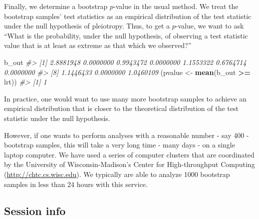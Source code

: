 \documentclass[oneside]{book}\usepackage[]{graphicx}\usepackage[]{color}
\newenvironment{Shaded}{\begin{snugshade}}{\end{snugshade}}
\newcommand{\CommentTok}[1]{\textcolor[rgb]{0.56,0.35,0.01}{\textit{#1}}}
\newcommand{\KeywordTok}[1]{\textcolor[rgb]{0.13,0.29,0.53}{\textbf{#1}}}
\newcommand{\NormalTok}[1]{#1}
\newcommand{\OperatorTok}[1]{\textcolor[rgb]{0.81,0.36,0.00}{\textbf{#1}}}
\newcommand{\StringTok}[1]{\textcolor[rgb]{0.31,0.60,0.02}{#1}}
\begin{document}
Finally, we determine a bootstrap $p$-value in the usual method. We treat
the bootstrap samples' test statistics as an empirical distribution of
the test statistic under the null hypothesis of pleiotropy. Thus, to get
a $p$-value, we want to ask ``What is the probability, under the null
hypothesis, of observing a test statistic value that is at least as
extreme as that which we observed?''

\begin{Shaded}
\begin{Highlighting}[]
\NormalTok{b_out}
\CommentTok{#>  [1] 2.8881948 0.0000000 0.9943472 0.0000000 1.1553322 0.6764714 0.0000000}
\CommentTok{#>  [8] 1.1446433 0.0000000 1.0460109}
\NormalTok{(pvalue <-}\StringTok{ }\KeywordTok{mean}\NormalTok{(b_out }\OperatorTok{>=}\StringTok{ }\NormalTok{lrt))}
\CommentTok{#> [1] 1}
\end{Highlighting}
\end{Shaded}

In practice, one would want to use many more bootstrap samples to
achieve an empirical distribution that is closer to the theoretical
distribution of the test statistic under the null hypothesis.

However, if one wants to perform analyses with a reasonable number - say
400 - bootstrap samples, this will take a very long time - many days -
on a single laptop computer. We have used a series of computer clusters
that are coordinated by the University of Wisconsin-Madison's Center for
High-throughput Computing (\url{http://chtc.cs.wisc.edu}). We typically
are able to analyze 1000 bootstrap samples in less than 24 hours with
this service.

\hypertarget{session-info}{%
\subsection{Session info}\label{session-info}}
\end{document}
